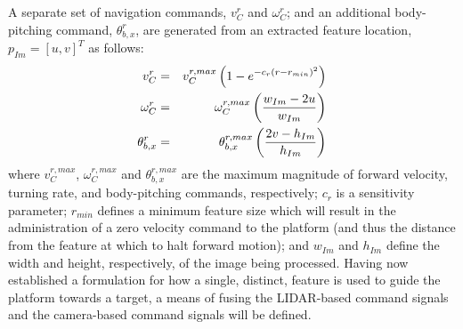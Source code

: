 			A separate set of navigation commands, $v_{C}^{r}$ and $\omega_{C}^{r}$; and an additional body-pitching command, $\theta_{b,x}^{r}$,  are generated from an extracted feature location, $p_{Im} = [u,v]^{T}$ as follows: 
				\begin{eqnarray}
					v_{C}^{r} 			& = & v_{C}^{r,max} \left( 1 - e^{ -c_{r} \left( r-r_{min} \right)^{2} } \right) 	\nonumber 	\\
					\omega_{C}^{r} 	& = & \omega_{C}^{r,max} \left(\frac{ w_{Im} - 2 u  }{ w_{Im} } \right)		\nonumber 	\\
					\theta_{b,x}^{r}	& = & \theta_{b,x}^{r,max} \left( \frac{ 2 v - h_{Im} }{ h_{Im} } \right) 		
				\end{eqnarray}
			where $v_{C}^{r,max}$, $\omega_{C}^{r,max}$ and $\theta_{b,x}^{r,max}$ are the maximum magnitude of forward velocity, turning rate, and body-pitching commands, respectively; $c_{r}$ is a sensitivity parameter; $r_{min}$ defines a minimum feature size which will result in the administration of a zero velocity command to the platform (and thus the distance from the feature at which to halt forward motion); and $w_{Im}$ and $h_{Im}$ define the width and height, respectively, of the image being processed. Having now established a formulation for how a single, distinct, feature is used to guide the platform towards a target, a means of fusing the LIDAR-based command signals and the camera-based command signals will be defined.

